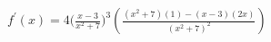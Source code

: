$ \displaystyle f^{\prime}(x) = 4\bigg(  \frac{x-3}{x^2+7}  \bigg)^3 \left(\frac{(x^2 + 7)(1) - (x-3)(2x)}{(x^2 + 7)^2}\right) $